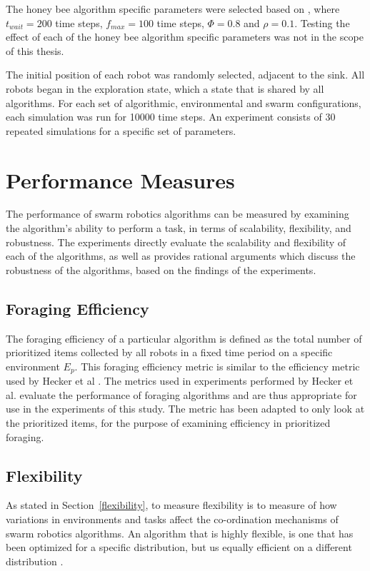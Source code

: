 The honey bee algorithm specific parameters were selected based on \cite{seeley2009wisdom}, where
 $t_{wait}=200$ time steps, $f_{max}=100$ time steps, $\Phi=0.8$ and $\rho=0.1$. Testing the effect of each of the honey bee algorithm specific parameters was not in the scope of this thesis.

The initial position of each robot was randomly selected, adjacent to the sink. All robots began in the exploration state, which a state that is shared by all algorithms. For each set of algorithmic, environmental and swarm configurations, each simulation was run for 10000 time steps. An experiment consists of 30 repeated simulations for a specific set of parameters.

\section{Performance Measures}
\label{thri:third:performancemeasures}

The performance of swarm robotics algorithms can be measured by examining the algorithm's ability to perform a task, in terms of scalability, flexibility, and robustness. The experiments directly evaluate the scalability and flexibility of each of the algorithms, as well as provides rational arguments which discuss the robustness of the algorithms, based on the findings of the experiments. 

\subsection{Foraging Efficiency}
\label{setup:foragingefficiency}
The foraging efficiency of a particular algorithm is defined as the total number of prioritized items collected by all robots in a fixed time period on a specific environment $E_p$. This foraging efficiency metric is similar to the efficiency metric used by Hecker et al \cite{hecker2015beyond}. The metrics used in experiments performed by Hecker et al. evaluate the performance of foraging algorithms and are thus appropriate for use in the experiments of this study. The metric has been adapted to only look at the prioritized items, for the purpose of examining efficiency in prioritized foraging.

\subsection{Flexibility}
\label{setup:flexibility}
As stated in Section~\ref{flexibility}, to measure flexibility is to measure of how variations in environments and tasks affect the co-ordination mechanisms of swarm robotics algorithms. An algorithm that is highly flexible, is one that has been optimized for a specific distribution, but us equally efficient on a different distribution \cite{hecker2015beyond}.

